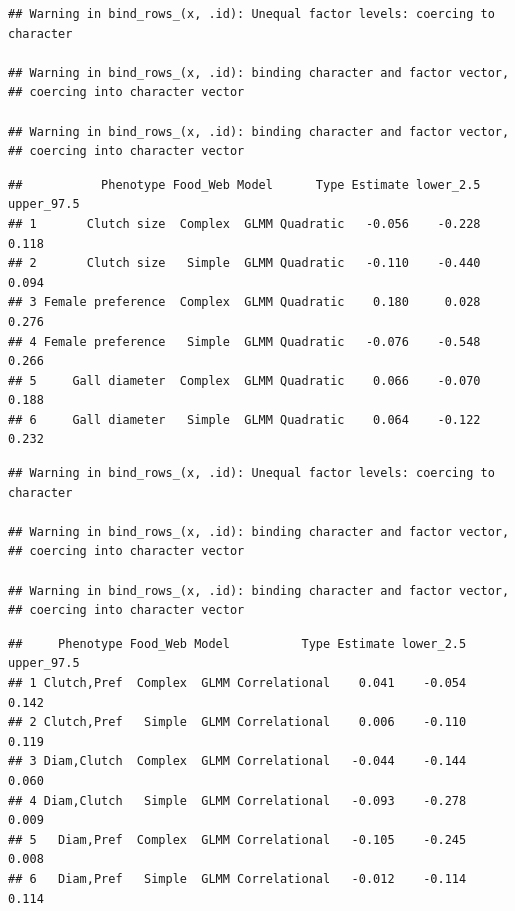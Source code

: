 \documentclass[]{elsarticle} %
\newenvironment{Shaded}{\begin{snugshade}}{\end{snugshade}}
\newcommand{\KeywordTok}[1]{\textcolor[rgb]{0.13,0.29,0.53}{\textbf{#1}}}
\newcommand{\StringTok}[1]{\textcolor[rgb]{0.31,0.60,0.02}{#1}}
\newcommand{\OperatorTok}[1]{\textcolor[rgb]{0.81,0.36,0.00}{\textbf{#1}}}
\newcommand{\NormalTok}[1]{#1}
\begin{document}
\begin{Shaded}
\end{Shaded}

\begin{verbatim}
## Warning in bind_rows_(x, .id): Unequal factor levels: coercing to character

## Warning in bind_rows_(x, .id): binding character and factor vector,
## coercing into character vector

## Warning in bind_rows_(x, .id): binding character and factor vector,
## coercing into character vector
\end{verbatim}

\begin{verbatim}
##           Phenotype Food_Web Model      Type Estimate lower_2.5 upper_97.5
## 1       Clutch size  Complex  GLMM Quadratic   -0.056    -0.228      0.118
## 2       Clutch size   Simple  GLMM Quadratic   -0.110    -0.440      0.094
## 3 Female preference  Complex  GLMM Quadratic    0.180     0.028      0.276
## 4 Female preference   Simple  GLMM Quadratic   -0.076    -0.548      0.266
## 5     Gall diameter  Complex  GLMM Quadratic    0.066    -0.070      0.188
## 6     Gall diameter   Simple  GLMM Quadratic    0.064    -0.122      0.232
\end{verbatim}

\begin{Shaded}
\end{Shaded}

\begin{verbatim}
## Warning in bind_rows_(x, .id): Unequal factor levels: coercing to character

## Warning in bind_rows_(x, .id): binding character and factor vector,
## coercing into character vector

## Warning in bind_rows_(x, .id): binding character and factor vector,
## coercing into character vector
\end{verbatim}

\begin{verbatim}
##     Phenotype Food_Web Model          Type Estimate lower_2.5 upper_97.5
## 1 Clutch,Pref  Complex  GLMM Correlational    0.041    -0.054      0.142
## 2 Clutch,Pref   Simple  GLMM Correlational    0.006    -0.110      0.119
## 3 Diam,Clutch  Complex  GLMM Correlational   -0.044    -0.144      0.060
## 4 Diam,Clutch   Simple  GLMM Correlational   -0.093    -0.278      0.009
## 5   Diam,Pref  Complex  GLMM Correlational   -0.105    -0.245      0.008
## 6   Diam,Pref   Simple  GLMM Correlational   -0.012    -0.114      0.114
\end{verbatim}
\end{document}
